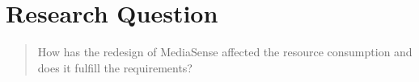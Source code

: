 \section{Research Question}
\begin{quotation}
How has the redesign of MediaSense affected the resource consumption and does it fulfill the requirements?
\end{quotation}

